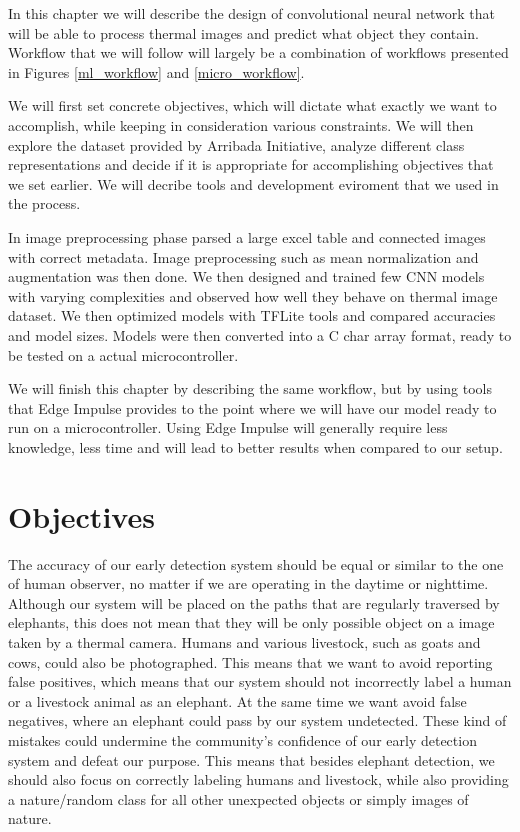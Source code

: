 In this chapter we will describe the design of convolutional neural network that will be able to process thermal images and predict what object they contain.
Workflow that we will follow will largely be a combination of workflows presented in Figures \ref{ml_workflow} and \ref{micro_workflow}.

We will first set concrete objectives, which will dictate what exactly we want to accomplish, while keeping in consideration various constraints.
We will then explore the dataset provided by Arribada Initiative, analyze different class representations and decide if it is appropriate for accomplishing objectives that we set earlier.
We will decribe tools and development eviroment that we used in the process.

In image preprocessing phase parsed a large excel table and connected images with correct metadata.
Image preprocessing such as mean normalization and augmentation was then done.
We then designed and trained few CNN models with varying complexities and observed how well they behave on thermal image dataset.
We then optimized models with TFLite tools and compared accuracies and model sizes.
Models were then converted into a C char array format, ready to be tested on a actual microcontroller.

We will finish this chapter by describing the same workflow, but by using tools that Edge Impulse provides to the point where we will have our model ready to run on a microcontroller.
Using Edge Impulse will generally require less knowledge, less time and will lead to better results when compared to our setup.


\section{ Objectives}

The accuracy of our early detection system should be equal or similar to the one of human observer, no matter if we are operating in the daytime or nighttime.
Although our system will be placed on the paths that are regularly traversed by elephants, this does not mean that they will be only possible object on a image taken by a thermal camera.
Humans and various livestock, such as goats and cows, could also be photographed.
This means that we want to avoid reporting false positives, which means that our system should not incorrectly label a human or a livestock animal as an elephant.
At the same time we want avoid false negatives, where an elephant could pass by our system undetected.
These kind of mistakes could undermine the community's confidence of our early detection system and defeat our purpose.
This means that besides elephant detection, we should also focus on correctly labeling humans and livestock, while also providing a nature/random class for all other unexpected objects or simply images of nature.

